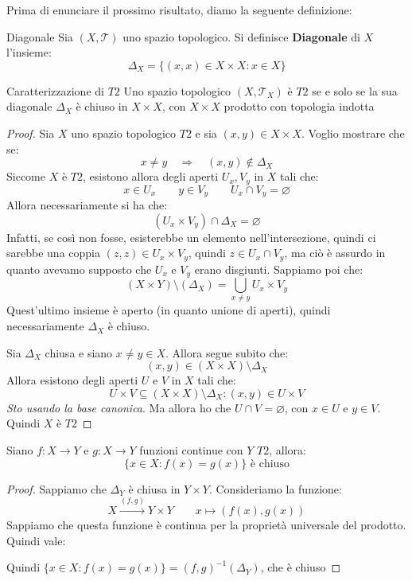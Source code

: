 \documentclass[11pt,a4paper,twoside]{article}
\theoremstyle{definition}
\begin{document}
Prima di enunciare il prossimo risultato, diamo la seguente definizione:

\begin{defn}{Diagonale}{}
	Sia $(X, \mathcal T)$ uno spazio topologico. Si definisce \textbf{Diagonale} di $X$ l'insieme:
	\[ \Delta_X = \{(x,x) \in X \times X : x \in X\} \]
\end{defn}

\begin{thm}{Caratterizzazione di $T2$}{}
	Uno spazio topologico $(X, \mathcal T_X)$ è $T2$ se e solo se la sua diagonale $\Delta_X$ è chiuso in $X \times X$, con $X \times X$ prodotto con topologia indotta
\end{thm}

\begin{proof}
	\fbox{$\Rightarrow$} Sia $X$ uno spazio topologico $T2$ e sia $(x,y) \in X \times X$. Voglio mostrare che se:
	\[ x \neq y \quad \Rightarrow \quad (x,y)\not \in \Delta_X \]
	Siccome $X$ è $T2$, esistono allora degli aperti $U_x, V_y$ in $X$ tali che:
	\[ x \in U_x \qquad y \in V_y \qquad U_x \cap V_y = \varnothing \]
	Allora necessariamente si ha che:
	\[ (U_x \times V_y) \cap \Delta_X = \varnothing \]
	Infatti, se così non fosse, esisterebbe un elemento nell'intersezione, quindi ci sarebbe una coppia $(z,z) \in U_x \times V_y$, quindi $z \in U_x \cap V_y$, ma ciò è assurdo in quanto avevamo supposto che $U_x$ e $V_y$ erano disgiunti. Sappiamo poi che:
	\[ (X \times Y)\setminus(\Delta_X) = \bigcup_{x \neq y}U_x \times V_y \]
	Quest'ultimo insieme è aperto (in quanto unione di aperti), quindi necessariamente $\Delta_X$ è chiuso.

	\fbox{$\Leftarrow$} Sia $\Delta_X$ chiusa e siano $x \neq y \in X$. Allora segue subito che:
	\[ (x,y) \in (X \times X) \setminus \Delta_X \]
	Allora esistono degli aperti $U$ e $V$ in $X$ tali che:
	\[ U \times V \subseteq (X \times X)\setminus \Delta_X : (x,y) \in U \times V \]
	\textit{Sto usando la base canonica}. Ma allora ho che $U \cap V = \varnothing$, con $x \in U$ e $y\in V$. Quindi $X$ è $T2$
\end{proof}

\begin{cor}{}{}
	Siano $f:X \to Y$ e $g:X \to Y$ funzioni continue con $Y$ $T2$, allora:
	\[ \{x \in X : f(x) = g(x)\}\text{ è chiuso} \]
\end{cor}

\begin{proof}
	Sappiamo che $\Delta_Y$ è chiusa in $Y \times Y$. Consideriamo la funzione:
	\[ X \xrightarrow{(f,g)} Y \times Y\qquad x \mapsto(f(x), g(x)) \]
	Sappiamo che questa funzione è continua per la proprietà universale del prodotto. Quindi vale:
	\begin{center}
	\end{center}
	Quindi $\{x \in X : f(x)=g(x)\} = (f,g)^{-1}(\Delta_Y)$, che è chiuso
\end{proof}
\end{document}
